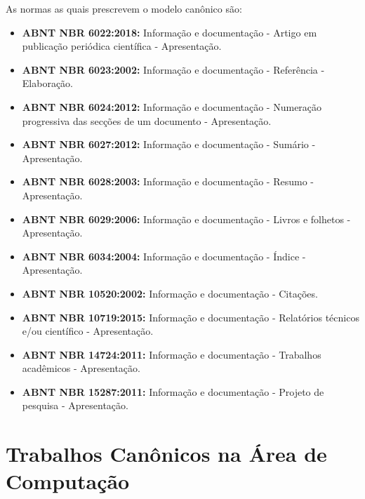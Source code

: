 \documentclass[
12pt,				%
openright,			%
oneside,			%
a4paper,			%
english,			%
french,				%
spanish,			%
brazil,				%
]{abntex2}
\begin{document}

As normas as quais prescrevem o modelo canônico são:

\begin{itemize}
\item \textbf{ABNT NBR 6022:2018:} Informação e documentação -
  Artigo em publicação periódica científica - Apresentação.
\item \textbf{ABNT NBR 6023:2002:} Informação e documentação -
  Referência - Elaboração.
\item \textbf{ABNT NBR 6024:2012:} Informação e documentação -
  Numeração progressiva das secções de um documento - Apresentação.
\item \textbf{ABNT NBR 6027:2012:} Informação e documentação -
  Sumário - Apresentação.
\item \textbf{ABNT NBR 6028:2003:} Informação e documentação -
  Resumo - Apresentação.
\item \textbf{ABNT NBR 6029:2006:} Informação e documentação -
  Livros e folhetos - Apresentação.
\item \textbf{ABNT NBR 6034:2004:} Informação e documentação -
  Índice - Apresentação.
\item \textbf{ABNT NBR 10520:2002:} Informação e documentação -
  Citações.
\item \textbf{ABNT NBR 10719:2015:} Informação e documentação -
  Relatórios técnicos e/ou científico - Apresentação.
\item \textbf{ABNT NBR 14724:2011:} Informação e documentação -
  Trabalhos acadêmicos - Apresentação.
\item \textbf{ABNT NBR 15287:2011:} Informação e documentação -
  Projeto de pesquisa - Apresentação.
\end{itemize}



\section{Trabalhos Canônicos na Área de Computação}
\end{document}
